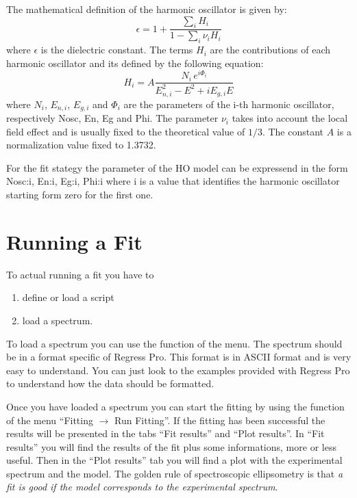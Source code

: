 \documentclass[a4paper]{report}
\begin{document}
The mathematical definition of the harmonic oscillator is given by:
\begin{equation}
  \epsilon = 1 + \frac{\sum_i H_i}{1 - \sum_i \nu_i H_i}
\end{equation}
where $\epsilon$ is the dielectric constant.
The terms $H_i$ are the contributions of each harmonic oscillator and its defined by the following equation:
\begin{equation}
  H_i = A \frac{N_i \, e^{i \Phi_i}}{E_{n,i}^2 - E^2 + i E_{g,i} E}
\end{equation}
where $N_i$, $E_{n,i}$, $E_{g,i}$ and $\Phi_i$ are the parameters of the i-th harmonic oscillator, respectively Nosc, En, Eg and Phi.
The parameter $\nu_i$ takes into account the local field effect and is usually fixed to the theoretical value of $1/3$.
The constant $A$ is a normalization value fixed to 1.3732.

For the fit stategy the parameter of the HO model can be expressend in the form Nosc:i, En:i, Eg:i, Phi:i where i is a value that identifies the harmonic oscillator starting form zero for the first one.


\chapter{Running a Fit}
To actual running a fit you have to
\begin{enumerate}
  \item define or load a script
  \item load a spectrum.
\end{enumerate}
To load a spectrum you can use the function of the menu. The spectrum
should be in a format specific of Regress Pro. This format is in ASCII
format and is very easy to understand. You can just look to the
examples provided with Regress Pro to understand how the data should
be formatted.

Once you have loaded a spectrum you can start the fitting by using the
function of the menu ``\textsf{Fitting $\rightarrow$ Run Fitting}''. If the
fitting has been successful the results will be presented in the tabs
``Fit results'' and ``Plot results''. In ``Fit results'' you will find
the results of the fit plus some informations, more or less
useful. Then in the ``Plot results'' tab you will find a plot with the
experimental spectrum and the model. The golden rule of spectroscopic
ellipsometry is that \emph{a fit is good if the model corresponds to
the experimental spectrum}.
\end{document}
